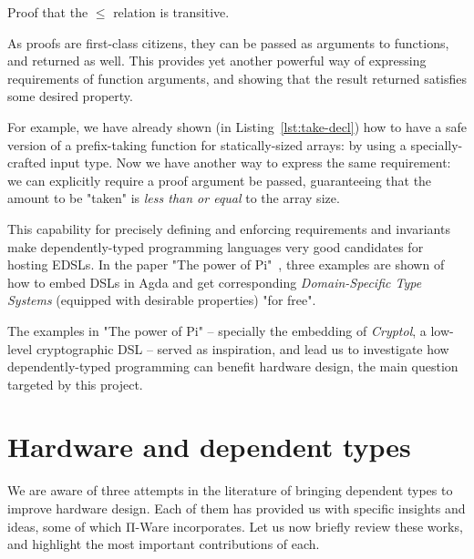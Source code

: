             \begin{listing}[h]
                \caption{Proof that the $\le$ relation is transitive. \label{lst:le-trans}}
            \end{listing}

            As proofs are first-class citizens, they can be passed as arguments to functions,
            and returned as well.
            This provides yet another powerful way of expressing requirements of function arguments,
            and showing that the result returned satisfies some desired property.

            For example, we have already shown (in Listing~\ref{lst:take-decl}) how to have a safe
            version of a prefix-taking function for statically-sized arrays:
            by using a specially-crafted input type.
            Now we have another way to express the same requirement:
            we can explicitly require a proof argument be passed,
            guaranteeing that the amount to be "taken" is \emph{less than or equal} to the array size.

            \begin{center}
            \end{center}

            This capability for precisely defining and enforcing requirements and invariants make
            dependently-typed programming languages very good candidates for hosting \acp{EDSL}.
            In the paper "The power of Pi"~\cite{power-pi}, three examples are shown of how to
            embed \acp{DSL} in Agda and get corresponding \emph{Domain-Specific Type Systems}
            (equipped with desirable properties) "for free".

            The examples in "The power of Pi" – specially the embedding of \emph{Cryptol},
            a low-level cryptographic \ac{DSL} – served as inspiration,
            and lead us to investigate how dependently-typed programming can benefit hardware
            design, the main question targeted by this project.



    \section{Hardware and dependent types}
    \label{sec:hardware-dtp}
        We are aware of three attempts in the literature of bringing dependent types to improve hardware design.
        Each of them has provided us with specific insights and ideas, some of which Π-Ware incorporates.
        Let us now briefly review these works, and highlight the most important contributions of each.

